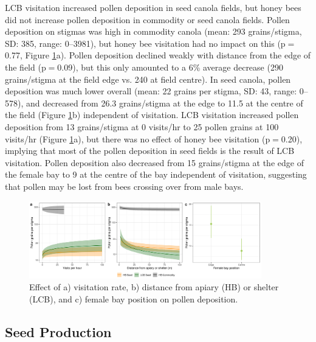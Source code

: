 \documentclass[12pt]{article} %
\begin{document}
LCB visitation increased pollen deposition in seed canola fields, but honey bees did not increase pollen deposition in commodity or seed canola fields.
Pollen deposition on stigmas was high in commodity canola (mean: 293 grains/stigma, SD: 385, range: 0--3981), but honey bee visitation had no impact on this (p$=$0.77, Figure \ref{fig:allPollen}a).
Pollen deposition declined weakly with distance from the edge of the field (p$=$0.09), but this only amounted to a 6\% average decrease (290 grains/stigma at the field edge vs. 240 at field centre).
In seed canola, pollen deposition was much lower overall (mean: 22 grains per stigma, SD: 43, range: 0--578), and decreased from 26.3 grains/stigma at the edge to 11.5 at the centre of the field (Figure \ref{fig:allPollen}b) independent of visitation.
LCB visitation increased pollen deposition from 13 grains/stigma at 0 visits/hr to 25 pollen grains at 100 visits/hr (Figure \ref{fig:allPollen}a), but there was no effect of honey bee visitation (p$=$0.20), implying that most of the pollen deposition in seed fields is the result of LCB visitation.
Pollen deposition also decreased from 15 grains/stigma at the edge of the female bay to 9 at the centre of the bay independent of visitation, suggesting that pollen may be lost from bees crossing over from male bays.%

\begin{figure}
    \centering
    \includegraphics[width=0.9\textwidth,keepaspectratio=true]{../Figures/allPollen.png}
    \caption{Effect of a) visitation rate, b) distance from apiary (HB) or shelter (LCB), and c) female bay position on pollen deposition.}
    \label{fig:allPollen}
\end{figure}


\subsection{Seed Production}
\end{document}
